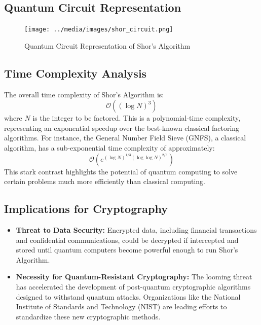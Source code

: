 \documentclass{article}
\begin{document}
\subsection{Quantum Circuit Representation}

\begin{figure}[!h]
    \centering
    \texttt{[image: ../media/images/shor\_circuit.png]}
    \caption{Quantum Circuit Representation of Shor's Algorithm}
    \label{fig:shor_circuit}
\end{figure}




\subsection{Time Complexity Analysis}

The overall time complexity of Shor's Algorithm is:
\[
    \mathcal{O}((\log N)^3)
\]
where $N$ is the integer to be factored. This is a polynomial-time complexity, representing an exponential speedup over the best-known classical factoring algorithms. For instance, the General Number Field Sieve (GNFS), a classical algorithm, has a sub-exponential time complexity of approximately:
\[
    \mathcal{O}\left(e^{(\log N)^{1/3} (\log \log N)^{2/3}}\right)
\]
This stark contrast highlights the potential of quantum computing to solve certain problems much more efficiently than classical computing.

\subsection{Implications for Cryptography}

\begin{itemize}
    \item \textbf{Threat to Data Security:} Encrypted data, including financial transactions and confidential communications, could be decrypted if intercepted and stored until quantum computers become powerful enough to run Shor's Algorithm.
    \item \textbf{Necessity for Quantum-Resistant Cryptography:} The looming threat has accelerated the development of post-quantum cryptographic algorithms designed to withstand quantum attacks. Organizations like the National Institute of Standards and Technology (NIST) are leading efforts to standardize these new cryptographic methods.
\end{itemize}
\end{document}

